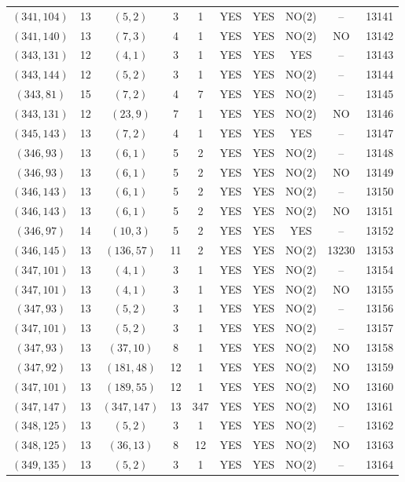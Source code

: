 \begin{longtable}{|c|c|c|c|c|c|c|c|c|c|}
$(341, 104)$ & 13 & $(5, 2)$ & 3 & 1 & YES & YES & NO(2) & -- & 13141\\
$(341, 140)$ & 13 & $(7, 3)$ & 4 & 1 & YES & YES & NO(2) & NO & 13142\\
$(343, 131)$ & 12 & $(4, 1)$ & 3 & 1 & YES & YES & YES & -- & 13143\\
$(343, 144)$ & 12 & $(5, 2)$ & 3 & 1 & YES & YES & NO(2) & -- & 13144\\
$(343, 81)$ & 15 & $(7, 2)$ & 4 & 7 & YES & YES & NO(2) & -- & 13145\\
$(343, 131)$ & 12 & $(23, 9)$ & 7 & 1 & YES & YES & NO(2) & NO & 13146\\
$(345, 143)$ & 13 & $(7, 2)$ & 4 & 1 & YES & YES & YES & -- & 13147\\
$(346, 93)$ & 13 & $(6, 1)$ & 5 & 2 & YES & YES & NO(2) & -- & 13148\\
$(346, 93)$ & 13 & $(6, 1)$ & 5 & 2 & YES & YES & NO(2) & NO & 13149\\
$(346, 143)$ & 13 & $(6, 1)$ & 5 & 2 & YES & YES & NO(2) & -- & 13150\\
$(346, 143)$ & 13 & $(6, 1)$ & 5 & 2 & YES & YES & NO(2) & NO & 13151\\
$(346, 97)$ & 14 & $(10, 3)$ & 5 & 2 & YES & YES & YES & -- & 13152\\
$(346, 145)$ & 13 & $(136, 57)$ & 11 & 2 & YES & YES & NO(2) & 13230 & 13153\\
$(347, 101)$ & 13 & $(4, 1)$ & 3 & 1 & YES & YES & NO(2) & -- & 13154\\
$(347, 101)$ & 13 & $(4, 1)$ & 3 & 1 & YES & YES & NO(2) & NO & 13155\\
$(347, 93)$ & 13 & $(5, 2)$ & 3 & 1 & YES & YES & NO(2) & -- & 13156\\
$(347, 101)$ & 13 & $(5, 2)$ & 3 & 1 & YES & YES & NO(2) & -- & 13157\\
$(347, 93)$ & 13 & $(37, 10)$ & 8 & 1 & YES & YES & NO(2) & NO & 13158\\
$(347, 92)$ & 13 & $(181, 48)$ & 12 & 1 & YES & YES & NO(2) & NO & 13159\\
$(347, 101)$ & 13 & $(189, 55)$ & 12 & 1 & YES & YES & NO(2) & NO & 13160\\
$(347, 147)$ & 13 & $(347, 147)$ & 13 & 347 & YES & YES & NO(2) & NO & 13161\\
$(348, 125)$ & 13 & $(5, 2)$ & 3 & 1 & YES & YES & NO(2) & -- & 13162\\
$(348, 125)$ & 13 & $(36, 13)$ & 8 & 12 & YES & YES & NO(2) & NO & 13163\\
$(349, 135)$ & 13 & $(5, 2)$ & 3 & 1 & YES & YES & NO(2) & -- & 13164\\

\end{longtable}
